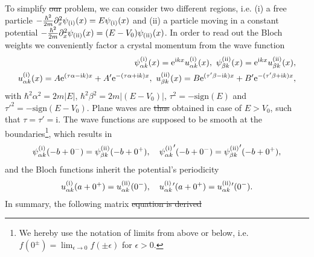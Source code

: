 \documentclass{svmono}
\def\ri{\mathrm i}
\def\re{\mathrm e}
\newcommand{\sign}[1]{\text{sign}\left( #1 \right)}
\newcommand{\abs}[1]{\left| #1 \right|}
\providecommand{\DIFaddtex}[1]{{\protect\color{blue}\uwave{#1}}} %
\providecommand{\DIFdeltex}[1]{{\protect\color{red}\sout{#1}}}                      %
\providecommand{\DIFaddbegin}{} %
\providecommand{\DIFaddend}{} %
\providecommand{\DIFdelbegin}{} %
\providecommand{\DIFdelend}{} %
\providecommand{\DIFadd}[1]{\texorpdfstring{\DIFaddtex{#1}}{#1}} %
\providecommand{\DIFdel}[1]{\texorpdfstring{\DIFdeltex{#1}}{}} %
\newcommand{\DIFscaledelfig}{0.5}
\newlength{\DIFdelgraphicswidth} %
\newlength{\DIFdelgraphicsheight} %
\newcommand{\DIFaddincludegraphics}[2][]{{\color{blue}\fbox{\DIFOincludegraphics[#1]{#2}}}} %
\newcommand{\DIFdelincludegraphics}[2][]{%
\sbox{\DIFdelgraphicsbox}{\DIFOincludegraphics[#1]{#2}}%
\settoboxwidth{\DIFdelgraphicswidth}{\DIFdelgraphicsbox} %
\settoboxtotalheight{\DIFdelgraphicsheight}{\DIFdelgraphicsbox} %
\scalebox{\DIFscaledelfig}{%
\parbox[b]{\DIFdelgraphicswidth}{\usebox{\DIFdelgraphicsbox}\\[-\baselineskip] \rule{\DIFdelgraphicswidth}{0em}}\llap{\resizebox{\DIFdelgraphicswidth}{\DIFdelgraphicsheight}{%
\setlength{\unitlength}{\DIFdelgraphicswidth}%
\begin{picture}(1,1)%
\thicklines\linethickness{2pt} %
{\color[rgb]{1,0,0}\put(0,0){\framebox(1,1){}}}%
{\color[rgb]{1,0,0}\put(0,0){\line( 1,1){1}}}%
{\color[rgb]{1,0,0}\put(0,1){\line(1,-1){1}}}%
\end{picture}%
}\hspace*{3pt}}} %
} %
\DeclareRobustCommand{\DIFaddbegin}{\DIFOaddbegin \let\includegraphics\DIFaddincludegraphics} %
\DeclareRobustCommand{\DIFaddend}{\DIFOaddend \let\includegraphics\DIFOincludegraphics} %
\DeclareRobustCommand{\DIFdelbegin}{\DIFOdelbegin \let\includegraphics\DIFdelincludegraphics} %
\DeclareRobustCommand{\DIFdelend}{\DIFOaddend \let\includegraphics\DIFOincludegraphics} %
\begin{document}
To simplify \DIFdelbegin \DIFdel{our }\DIFdelend \DIFaddbegin \DIFadd{the }\DIFaddend problem, we can consider two different regions, i.e. (i) a free particle $-\frac{\hbar^2}{2m}\partial_x^2\psi_{\rm (i)}(x) = E\psi_{\rm (i)}(x)$ and (ii) a particle moving in a constant potential $-\frac{\hbar^2}{2m}\partial_x^2\psi_{\rm (ii)}(x) = (E-V_0)\psi_{\rm (ii)}(x)$.
In order to read out the Bloch weights we conveniently factor a crystal momentum from the wave function
\begin{align}
    \psi_{\alpha k}^{\rm (i)}(x) = \re^{\ri kx}u_{\alpha k}^{\rm (i)}(x),
    \
    \psi_{\beta k}^{\rm (ii)}(x) = \re^{\ri kx}u_{\beta k}^{\rm (ii)}(x),
    \\
    u_{\alpha k}^{\rm (i)}(x) = A\re^{(\tau\alpha-\ri k) x} + A'\re^{-(\tau\alpha+\ri k) x},
    \
    u_{\beta k}^{\rm (ii)}(x) = B\re^{(\tau'\beta-\ri k) x} + B'\re^{-(\tau'\beta+\ri k) x},
\end{align}
with $\hbar^2\alpha^2 = 2m\abs{E}$, $\hbar^2\beta^2 = 2m\abs{(E-V_0)}$, $\tau^2=-\sign{E}$ and $\tau'^2=-\sign{E-V_0}$.
Plane waves are \DIFdelbegin \DIFdel{thus }\DIFdelend obtained in case of $E>V_0$, such that $\tau=\tau'=\ri$.
The wave functions are supposed to be smooth at the boundaries\footnote{We hereby use the notation of limits from above or below, i.e. $f(0^\pm)=\lim_{\epsilon\rightarrow0}f(\pm\epsilon)$ for $\epsilon>0$.}, which results in
\begin{align}
\psi_{\alpha k}^{\rm (i)}(-b+0^-)=\psi_{\beta k}^{\rm (ii)}(-b+0^+),
    \quad
    {\psi_{\alpha k}^{\rm (i)}}'(-b+0^-)={\psi_{\beta k}^{\rm (ii)}}'(-b+0^+),
\end{align}
and the Bloch functions inherit the potential's periodicity
\begin{align}
    u_{\alpha k}^{\rm (i)}(a+0^+) = u_{\alpha k}^{\rm (ii)}(0^-),
    \quad
    u_{\alpha k}^{\rm (i)}{}'(a+0^+) = u_{\alpha k}^{\rm (ii)}{}'(0^-).
\end{align}
In summary, the following matrix \DIFdelbegin \DIFdel{equation is derived
}%
\end{document}
